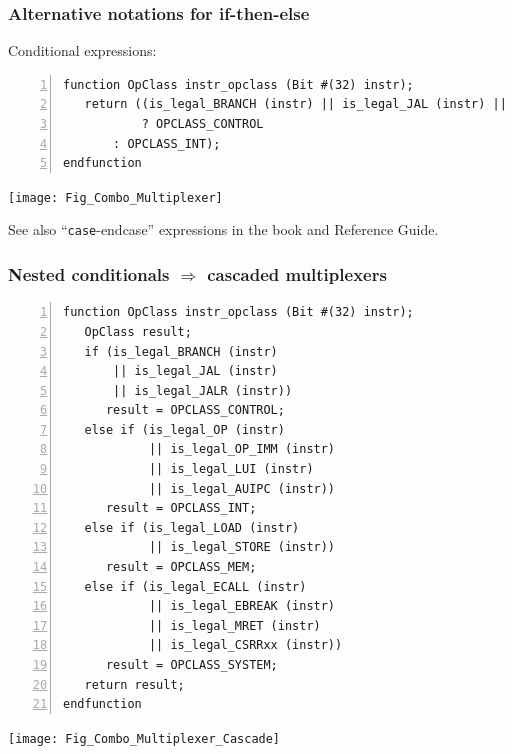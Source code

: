 
\begin{frame}[fragile]
\frametitle{Alternative notations for if-then-else}

\footnotesize

Conditional expressions:

\begin{Verbatim}[frame=single, numbers=left]
function OpClass instr_opclass (Bit #(32) instr);
   return ((is_legal_BRANCH (instr) || is_legal_JAL (instr) || is_legal_JALR (instr))
           ? OPCLASS_CONTROL
	   : OPCLASS_INT);
endfunction
\end{Verbatim}

\vspace{1ex}

\begin{center}
 \texttt{[image: Fig\_Combo\_Multiplexer]}
\end{center}

\vspace{3ex}

See also ``{\tt case}-{endcase}'' expressions in the book and {\BSV} Reference Guide.

\end{frame}


\begin{frame}[fragile]
\frametitle{Nested conditionals $\Rightarrow$ cascaded multiplexers}

\begin{minipage}{0.3\textwidth}\tiny
\begin{Verbatim}[frame=single, numbers=left]
function OpClass instr_opclass (Bit #(32) instr);
   OpClass result;
   if (is_legal_BRANCH (instr)
       || is_legal_JAL (instr)
       || is_legal_JALR (instr))
      result = OPCLASS_CONTROL;
   else if (is_legal_OP (instr)
            || is_legal_OP_IMM (instr)
            || is_legal_LUI (instr)
            || is_legal_AUIPC (instr))
      result = OPCLASS_INT;
   else if (is_legal_LOAD (instr)
            || is_legal_STORE (instr))
      result = OPCLASS_MEM;
   else if (is_legal_ECALL (instr)
            || is_legal_EBREAK (instr)
            || is_legal_MRET (instr)
            || is_legal_CSRRxx (instr))
      result = OPCLASS_SYSTEM;
   return result;
endfunction
\end{Verbatim}
\end{minipage}
\hm
\begin{minipage}{0.65\textwidth}
\begin{center}
 \texttt{[image: Fig\_Combo\_Multiplexer\_Cascade]}
\end{center}
\end{minipage}

\end{frame}

